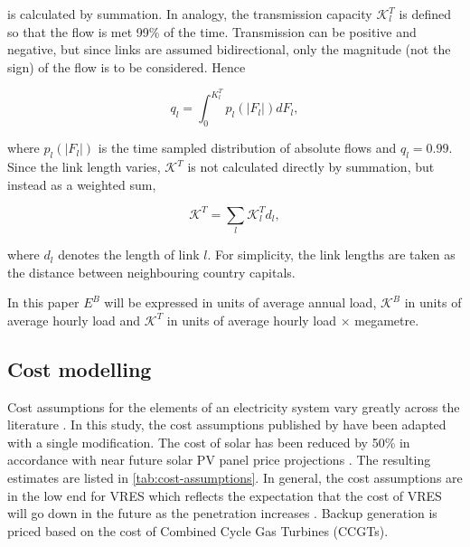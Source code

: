 \documentclass[a4paper, 5p, sort&compress]{elsarticle}%
\begin{document}
is calculated by summation. In analogy, the transmission capacity $\mathcal{K}^{T}_{l}$ is defined
so that the flow is met 99\% of the time. Transmission can be
positive and negative, but since links are assumed bidirectional, only
the magnitude (not the sign) of the flow is to be considered. Hence

\begin{equation}
  \label{eq:link-cap}
  q_{l} = \int _{0} ^{K_{l}^{T}} p_{l}(|F_{l}|)dF_{l},
\end{equation}

where $p_{l}(|F_{l}|)$ is the time sampled distribution of absolute
flows and $q_{l} = 0.99$. Since the link length varies,
$\mathcal{K}^{T}$ is not calculated directly by summation, but instead
as a weighted sum,

\begin{equation}
  \label{eq:4}
  \mathcal{K}^{T} = \sum_{l} \mathcal{K}^{T}_{l} d_{l},
\end{equation}

where $d_{l}$ denotes the length of link $l$. For simplicity, the link
lengths are taken as the distance between neighbouring country
capitals. %

In this paper $E^{B}$ will be expressed in units of average annual
load, $\mathcal{K}^{B}$ in units of average hourly load and
$\mathcal{K}^{T}$ in units of average hourly load $\times$ megametre.

\subsection{Cost modelling}
\label{sec:cost-modelling}

Cost assumptions for the elements of an electricity system vary
greatly across the literature \cite{Sensitivity}. In this study, the
cost assumptions published by \cite{Rolando} have been adapted with a
single modification. The cost of solar has been reduced by 50\% in
accordance with near future solar PV panel price projections
\cite{irena}. The resulting estimates are listed in
\cref{tab:cost-assumptions}. In general, the cost assumptions are in
the low end for VRES which reflects the expectation that the cost of
VRES will go down in the future as the penetration increases
\cite{Fraunhofer}.  Backup generation is priced based on the cost of Combined Cycle Gas Turbines (CCGTs).
\end{document}
